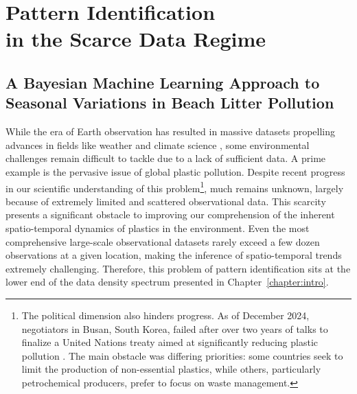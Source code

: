 
\ifpdf
    \graphicspath{{content/chapter7/figs/raster/}{content/chapter7/figs/pdf/}{content/chapter7/figs/}}
\else
    \graphicspath{{content/chapter7/figs/vector/}{content/chapter7/figs/}}
\fi


\part[Pattern Identification in the Scarce Data Regime]{Pattern Identification\\in the Scarce Data Regime}\label{part:scarce_data}

\chapter[A Bayesian Machine Learning Approach to Seasonal Variations in Beach Litter Pollution]{A Bayesian Machine Learning Approach to\\Seasonal Variations in Beach Litter Pollution}\label{chapter:beach_litter}


While the era of Earth observation has resulted in massive datasets propelling advances in fields like weather and climate science \cite{price_probabilistic_2024,chen_machine_2024}, some environmental challenges remain difficult to tackle due to a lack of sufficient data. A prime example is the pervasive issue of global plastic pollution. Despite recent progress in our scientific understanding of this problem\footnote{The political dimension also hinders progress. As of December 2024, negotiators in Busan, South Korea, failed after over two years of talks to finalize a United Nations treaty aimed at significantly reducing plastic pollution \cite{stallard_global_2024}. The main obstacle was differing priorities: some countries seek to limit the production of non-essential plastics, while others, particularly petrochemical producers, prefer to focus on waste management.}, much remains unknown, largely because of extremely limited and scattered observational data. This scarcity presents a significant obstacle to improving our comprehension of the inherent spatio-temporal dynamics of plastics in the environment. Even the most comprehensive large-scale observational datasets rarely exceed a few dozen observations at a given location, making the inference of spatio-temporal trends extremely challenging. Therefore, this problem of pattern identification sits at the lower end of the data density spectrum presented in Chapter~\ref{chapter:intro}.

